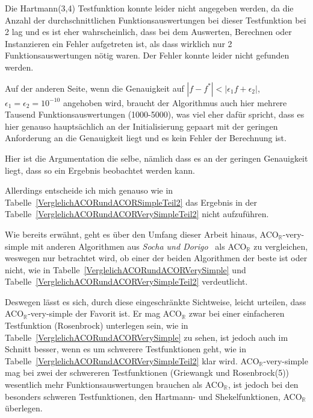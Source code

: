 \documentclass[fontsize=12, a4aper]{scrartcl}
\begin{document}
	Die Hartmann(3,4) Testfunktion konnte leider nicht angegeben werden, da die Anzahl der durchschnittlichen Funktionsauswertungen bei dieser Testfunktion bei 2 lag und es ist eher wahrscheinlich, dass bei dem Auswerten, Berechnen oder Instanzieren ein Fehler aufgetreten ist, als dass wirklich nur 2 Funktionsauswertungen nötig waren. Der Fehler konnte leider nicht gefunden werden.\hfill\newline
	
	Auf der anderen Seite, wenn die Genauigkeit auf \(|f-f^*|<|\epsilon_1f + \epsilon_2|\), \(\epsilon_1=\epsilon_2=10^{-10}\) angehoben wird, braucht der Algorithmus auch hier mehrere Tausend Funktionsauswertungen (1000-5000), was viel eher dafür spricht, dass es hier genauso hauptsächlich an der Initialisierung gepaart mit der geringen Anforderung an die Genauigkeit liegt und es kein Fehler der Berechnung ist.\hfill\newline
	
	Hier ist die Argumentation die selbe, nämlich dass es an der geringen Genauigkeit liegt, dass so ein Ergebnis beobachtet werden kann.\hfill\newline
	
	Allerdings entscheide ich mich genauso wie in Tabelle~\ref{VerglelichACORundACORSimpleTeil2} das Ergebnis in der Tabelle~\ref{VerglelichACORundACORVerySimpleTeil2} nicht aufzuführen.\hfill\newline

	Wie bereits erwähnt, geht es über den Umfang dieser Arbeit hinaus, ACO\(_{\mathbb{R}}\)-very-simple mit anderen Algorithmen aus \textit{Socha und Dorigo}~\cite{socha2008ant} als ACO\(_{\mathbb{R}}\) zu vergleichen, weswegen nur betrachtet wird, ob einer der beiden Algorithmen der beste ist oder nicht, wie in Tabelle~\ref{VerglelichACORundACORVerySimple} und Tabelle~\ref{VerglelichACORundACORVerySimpleTeil2} verdeutlicht.\hfill\newline
	
	Deswegen lässt es sich, durch diese eingeschränkte Sichtweise, leicht urteilen, dass ACO\(_{\mathbb{R}}\)-very-simple der Favorit ist. Er mag ACO\(_{\mathbb{R}}\) zwar bei einer einfacheren Testfunktion (Rosenbrock) unterlegen sein, wie in Tabelle~\ref{VerglelichACORundACORVerySimple} zu sehen, ist jedoch auch im Schnitt besser, wenn es um schwerere Testfunktionen geht, wie in Tabelle~\ref{VerglelichACORundACORVerySimpleTeil2} klar wird. ACO\(_{\mathbb{R}}\)-very-simple mag bei zwei der schwereren Testfunktionen (Griewangk und Rosenbrock(5)) wesentlich mehr Funktionsauswertungen brauchen als ACO\(_{\mathbb{R}}\), ist jedoch bei den besonders schweren Testfunktionen, den Hartmann- und Shekelfunktionen, ACO\(_{\mathbb{R}}\) überlegen.\hfill\newline
	
\end{document}
